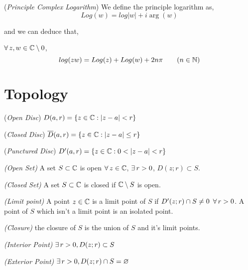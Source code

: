 \documentclass{article}
\begin{document}
\begin{ndefi}{(\textit{Principle Complex Logarithm})}
  We define the principle logarithm as,
  $$ Log(w) = log |w| + i\arg(w) $$
\end{ndefi}
and we can deduce that,
\begin{nlemma}
  $\forall\, z, w \in \mathbb{C}\setminus {0}$,
  $$ log(zw) = Log(z) + Log(w) + 2n\pi \qquad (n \in \mathbb{N}) $$
\end{nlemma}

\section{Topology}

\begin{ndefi}{(\textit{Open Disc})}
  $D(a, r) = \{z\in\mathbb{C} : |z - a| < r\}$
\end{ndefi}

\begin{ndefi}{(\textit{Closed Disc})}
  $\overline D(a, r) = \{z\in\mathbb{C} : |z - a| \le r\}$
\end{ndefi}

\begin{ndefi}{(\textit{Punctured Disc})}
  $D'(a, r) = \{z\in\mathbb{C} : 0 < |z - a| < r\}$
\end{ndefi}

\begin{ndefi}{\textit{(Open Set)}}
  A set $S\subset \mathbb{C}$ is open $\forall\, z\in\mathbb{C}$, $\exists\, r > 0$, $D(z; r) \subset S$.
\end{ndefi}

\begin{ndefi}{\textit{(Closed Set)}}
  A set $S\subset \mathbb{C}$ is closed if $\mathbb{C}\setminus S$ is open.
\end{ndefi}

\begin{ndefi}{\textit{(Limit point)}}
  A point $z\in\mathbb{C}$ is a limit point of $S$ if $D'(z;r)\cap S \neq 0\,\,\,\forall\, r>0$. A point of $S$ which isn't a limit point is an isolated point.
\end{ndefi}

\begin{ndefi}{\textit{(Closure)}}
  the closure of $S$ is the union of $S$ and it's limit points.
\end{ndefi}

\begin{ndefi}{\textit{(Interior Point)}}
  $\exists\, r > 0, D(z;r) \subset S$
\end{ndefi}

\begin{ndefi}{\textit{(Exterior Point)}}
  $\exists\, r>0, D(z;r) \cap S = \varnothing$
\end{ndefi}
\end{document}

